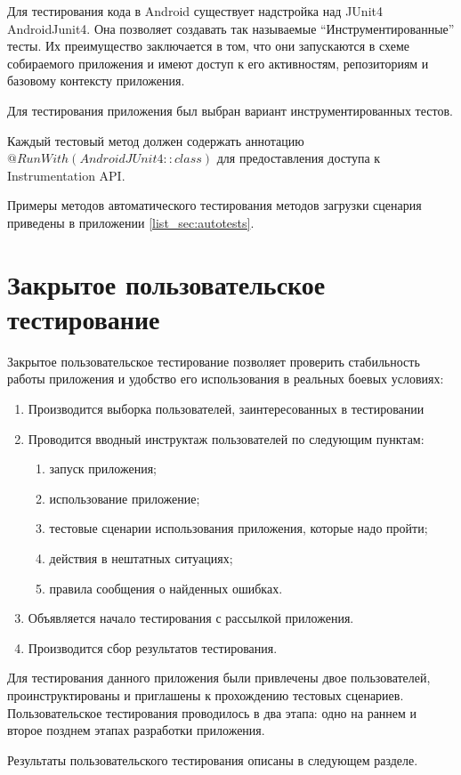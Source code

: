 Для тестирования кода в Android существует надстройка над JUnit4 \textemdash\space AndroidJunit4. Она позволяет создавать так называемые ``Инструментированные'' тесты. Их преимущество заключается в том, что они запускаются в схеме собираемого приложения и имеют доступ к его активностям, репозиториям и базовому контексту приложения.

Для тестирования приложения был выбран вариант инструментированных тестов.

Каждый тестовый метод должен содержать аннотацию $@RunWith(AndroidJUnit4::class)$ для предоставления доступа к Instrumentation API.

Примеры методов автоматического тестирования методов загрузки сценария приведены в приложении \ref{list_sec:autotests}.

\section{Закрытое пользовательское тестирование}
\label{sec:usertesting}
Закрытое пользовательское тестирование позволяет проверить стабильность работы приложения и удобство его использования в реальных боевых условиях:
\begin{enumerate}
	\item Производится выборка пользователей, заинтересованных в тестировании
	\item Проводится вводный инструктаж пользователей по следующим пунктам:
	\begin{enumerate}
		\item запуск приложения;
		\item использование приложение;
		\item тестовые сценарии использования приложения, которые надо пройти;
		\item действия в нештатных ситуациях;
		\item правила сообщения о найденных ошибках.
	\end{enumerate}
	\item Объявляется начало тестирования с рассылкой приложения.
	\item Производится сбор результатов тестирования.
\end{enumerate}
\smallskip
Для тестирования данного приложения были привлечены двое пользователей, проинструктированы и приглашены к прохождению тестовых сценариев.
Пользовательское тестирования проводилось в два этапа: одно на раннем и второе позднем этапах разработки приложения.

Результаты пользовательского тестирования описаны в следующем разделе.

